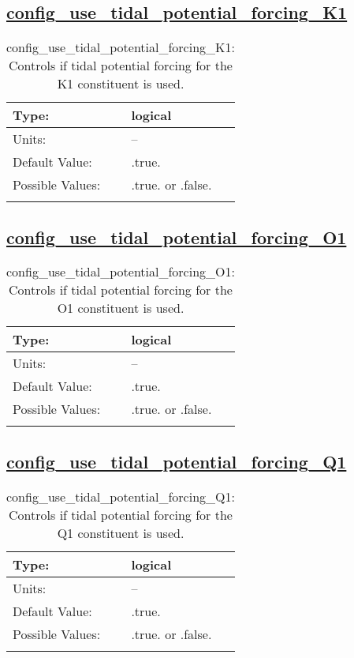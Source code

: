 \subsection[config\_use\_tidal\_potential\_forcing\_K1]{\hyperref[sec:nm_tab_tidal_potential_forcing]{config\_use\_tidal\_potential\_forcing\_K1}}
\label{subsec:nm_sec_config_use_tidal_potential_forcing_K1}
\begin{center}
\begin{longtable}{| p{2.0in} || p{4.0in} |}
    \hline
    Type: & logical \\
    \hline
    Units: & -- \\
    \hline
    Default Value: & .true. \\
    \hline
    Possible Values: & .true. or .false. \\
    \hline
    \caption{config\_use\_tidal\_potential\_forcing\_K1: Controls if tidal potential forcing for the K1 constituent is used.}
\end{longtable}
\end{center}
\subsection[config\_use\_tidal\_potential\_forcing\_O1]{\hyperref[sec:nm_tab_tidal_potential_forcing]{config\_use\_tidal\_potential\_forcing\_O1}}
\label{subsec:nm_sec_config_use_tidal_potential_forcing_O1}
\begin{center}
\begin{longtable}{| p{2.0in} || p{4.0in} |}
    \hline
    Type: & logical \\
    \hline
    Units: & -- \\
    \hline
    Default Value: & .true. \\
    \hline
    Possible Values: & .true. or .false. \\
    \hline
    \caption{config\_use\_tidal\_potential\_forcing\_O1: Controls if tidal potential forcing for the O1 constituent is used.}
\end{longtable}
\end{center}
\subsection[config\_use\_tidal\_potential\_forcing\_Q1]{\hyperref[sec:nm_tab_tidal_potential_forcing]{config\_use\_tidal\_potential\_forcing\_Q1}}
\label{subsec:nm_sec_config_use_tidal_potential_forcing_Q1}
\begin{center}
\begin{longtable}{| p{2.0in} || p{4.0in} |}
    \hline
    Type: & logical \\
    \hline
    Units: & -- \\
    \hline
    Default Value: & .true. \\
    \hline
    Possible Values: & .true. or .false. \\
    \hline
    \caption{config\_use\_tidal\_potential\_forcing\_Q1: Controls if tidal potential forcing for the Q1 constituent is used.}
\end{longtable}
\end{center}
